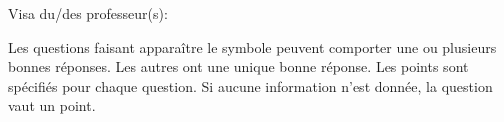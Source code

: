 \documentclass[a4paper]{article}
\begin{document}
\begin{examcopy}[1]
    \vspace*{4cm}Visa du/des professeur(s): \dotfill


    \vfill
    \newpage

    {
    \em\setlength{\parindent}{0pt}

    Les questions faisant apparaître le symbole \multiSymbole{} peuvent
      comporter une ou plusieurs bonnes réponses. Les autres ont
      une unique bonne réponse. Les points sont spécifiés pour chaque question. Si aucune information n'est donnée, la question vaut un point.

    }\hspace*{\fill}
    \vspace{1ex}



    
  \end{examcopy}
\end{document}
